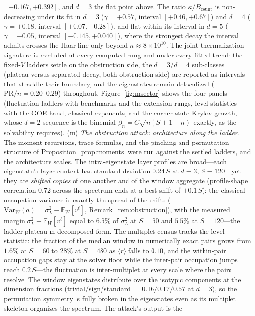 \begin{remark}
$[-0.167,+0.392]$, and $d=3$ the flat point above. The ratio
$\kappa/B_{\mathrm{count}}$ is non-decreasing under its fit in $d=3$
($\gamma=+0.57$, interval $[+0.46,+0.67]$) and $d=4$ ($\gamma=+0.18$,
interval $[+0.07,+0.28]$), and flat within its interval in $d=5$
($\gamma=-0.05$, interval $[-0.145,+0.040]$), where the strongest decay
the interval admits crosses the Haar line only beyond
$n\approx8\times10^{10}$. The joint thermalization signature is
excluded at every computed rung and under every fitted trend: the
fixed-$V$ ladders settle on the obstruction side, the $d=3$/$d=4$
sub-classes (plateau versus separated decay, both obstruction-side) are
reported as intervals that straddle their boundary, and the eigenstates
remain delocalized ($\mathrm{PR}/n=0.20$--$0.29$) throughout.
Figure~\ref{fig:msector}
shows the four panels (fluctuation ladders with benchmarks and the
extension rungs, level statistics with the GOE band, classical
exponents, and the corner-state Krylov growth, whose $d=2$ sequence is
the binomial $\beta_n=C\sqrt{n(S+1-n)}$ exactly, as the solvability
requires).
(m) \emph{The obstruction attack: architecture along the ladder.} The
moment recursions, trace formulas, and the pinching and permutation
structure of Proposition~\ref{prop:moments} were run against the settled
ladders, and the architecture scales. The intra-eigenstate layer profiles
are broad---each eigenstate's layer content has standard deviation
$0.24\,S$ at $d=3$, $S=120$---yet they are \emph{shifted copies} of one
another and of the window aggregate (profile-shape correlation $0.72$
across the spectrum ends at a best shift of $\pm0.1\,S$): the classical
occupation variance is exactly the spread of the shifts
($\mathrm{Var}_{W}(a)=\sigma_L^{2}-\mathbb{E}_W[v^{\ell}]$,
Remark~\ref{rem:obstruction}), with the measured margin
$\sigma_L^{2}-\mathbb{E}_W[v^{\ell}]$ equal to $6.6\%$ of
$\sigma_L^{2}$ at $S=60$ and $5.5\%$ at $S=120$---the ladder plateau in
decomposed form. The multiplet census tracks the level statistic: the
fraction of the median window in numerically exact pairs grows from
$1.6\%$ at $S=60$ to $28\%$ at $S=480$ as $\langle r\rangle$ falls to
$0.10$, and the within-pair occupation gaps stay at the solver floor
while the inter-pair occupation jumps reach $0.2\,S$---the fluctuation is
inter-multiplet at every scale where the pairs resolve. The window
eigenstates distribute over the isotypic components at the dimension
fractions (trivial/sign/standard $=0.16/0.17/0.67$ at $d=3$), so the
permutation symmetry is fully broken in the eigenstates even as its
multiplet skeleton organizes the spectrum. The attack's output is the

\end{remark}
